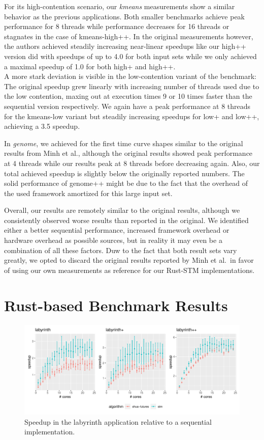 For its high-contention scenario, our \emph{kmeans} measurements show a similar behavior as the previous applications.
Both smaller benchmarks achieve peak performance for 8 threads while performance decreases for 16 threads or stagnates in the case of kmeans-high++.
In the original measurements however, the authors achieved steadily increasing near-linear speedups like our high++ version did with speedups of up to 4.0 for both input sets while we only achieved a maximal speedup of 1.0 for both high+ and high++.\\
A more stark deviation is visible in the low-contention variant of the benchmark:
The original speedup grew linearly with increasing number of threads used due to the low contention, maxing out at execution times 9 or 10 times faster than the sequential version respectively.
We again have a peak performance at 8 threads for the kmeans-low variant but steadily increasing speedups for low+ and low++, achieving a 3.5 speedup.

In \emph{genome}, we achieved for the first time curve shapes similar to the original results from Minh et al., although the original results showed peak performance at 4 threads while our results peak at 8 threads before decreasing again.
Also, our total achieved speedup is slightly below the originally reported numbers.
The solid performance of genome++ might be due to the fact that the overhead of the used framework amortized for this large input set.

Overall, our results are remotely similar to the original results, although we consistently observed worse results than reported in the original.
We identified either a better sequential performance, increased framework overhead or hardware overhead as possible sources, but in reality it may even be a combination of all these factors.
Duw to the fact that both result sets vary greatly, we opted to discard the original results reported by Minh et al.\ in favor of using our own measurements as reference for our Rust-STM implementations.


\section{Rust-based Benchmark Results}

\begin{figure}
    \centering
    \includegraphics[width=\textwidth,keepaspectratio]{gfx/results/labyrinth_comb}
    \caption{Speedup in the labyrinth application relative to a sequential implementation.}%
    \label{fig:evaluation:labyrinth}
\end{figure}

